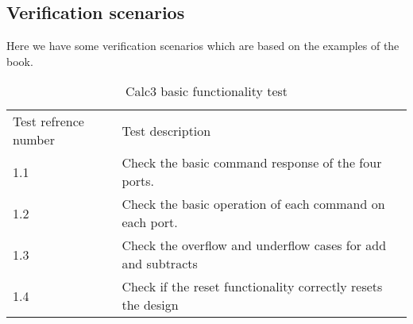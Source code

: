 \documentclass[a4paper, 11pt]{article}
\begin{document}
\subsection{Verification scenarios}
Here we have some verification scenarios which are based on the examples of the
book. \\
\begin{table}[H]
    \centering
    \begin{tabular}{lp{12cm}l}
        \toprule
        Test refrence number& Test description\\
        \cmidrule(r){1-1}\cmidrule(lr){2-2}
        1.1 & Check the basic command response of the four ports. \\
        1.2 & Check the basic operation of each command on each port.\\
        1.3 & Check the overflow and underflow cases for add and subtracts \\
        1.4 & Check if the reset functionality correctly resets the design\\
        \bottomrule
    \end{tabular}
    \caption{Calc3 basic functionality test}
    \label{table:3}
\end{table}
\end{document}
